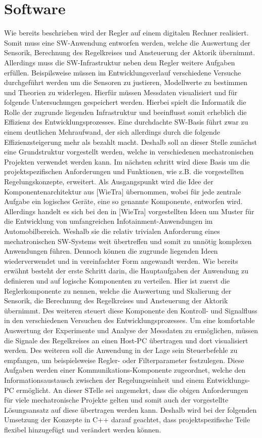 \section{Software}
Wie bereits beschrieben wird der Regler auf einem digitalen Rechner realisiert. Somit muss eine SW-Anwendung entworfen werden, welche die Auswertung der Sensorik, Berechnung des Regelkreises und Ansteuerung der Aktorik übernimmt. Allerdings muss die SW-Infrastruktur neben dem Regler weitere Aufgaben erfüllen. Beispilsweise müssen im Entwicklungsverlauf verschiedene Versuche durchgeführt werden um die Sensoren zu justieren, Modellwerte zu bestimmen und Theorien zu widerlegen. Hierfür müssen Messdaten visualisiert und für folgende Untersuchungen gespeichert werden.
Hierbei spielt die Informatik die Rolle der zugrunde liegenden Infrastruktur und beeinflusst somit erheblich die Effizienz des Entwicklungsprozesses. Eine durchdachte SW-Basis führt zwar zu einem deutlichen Mehraufwand, der sich allerdings durch die folgende Effizienzsteigerung mehr als bezahlt macht.
Deshalb soll an dieser Stelle zunächst eine Grundstruktur vorgestellt werden, welche in verschiedenen mechatronischen Projekten verwendet werden kann. Im nächsten schritt wird diese Basis um die projektspezifischen Anforderungen und Funktionen, wie z.B. die vorgestellten Regelungskonzepte, erweitert. Als Ausgangspunkt wird die Idee der Komponentenarchitektur aus [WieTra] übernommen, wobei für jede zentrale Aufgabe ein logisches Geräte, eine so genannte Komponente, entworfen wird.
Allerdings handelt es sich bei den in [WieTra] vorgestellten Ideen um Muster für die Entwicklung von umfangreichen Infotainment-Anwendungen im Automobilbereich. Weshalb sie die relativ trivialen Anforderung eines mechatronischen SW-Systems weit übertreffen und somit zu unnötig komplexen Anwendungen führen. Dennoch können die zugrunde liegenden Ideen wiederverwendet und in vereinfachter Form angewandt werden. 
Wie bereits erwähnt besteht der erste Schritt darin, die Hauptaufgaben der Anwendung zu definieren und auf logische Komponenten zu verteilen.
Hier ist zuerst die Reglerkomponente zu nennen, welche die Auswertung und Skalierung der Sensorik, die Berechnung des Regelkreises und Ansteuerung der Aktorik übernimmt. Des weiteren steuert diese Komponente den Kontroll- und Signalfluss in den verschiedenen Versuchen des Entwicklungsprozesses.
Um eine komfortable Auswertung der Experimente und Analyse der Messdaten zu ermöglichen, müssen die Signale des Regelkreises an einen Host-PC übertragen und dort visualisiert werden. Des weiteren soll die Anwendung in der Lage sein Steuerbefehle zu empfangen, um beispielsweise Regler- oder Filterparameter festzulegen. Diese Aufgaben werden einer Kommunikations-Komponente zugeordnet, welche den Informationsaustausch zwischen der Regelungseinheit und einem Entwicklungs-PC ermöglicht.
An dieser STelle sei angemekrt, dass die obigen Anforderungen für viele mechatronische Projekte gelten und somit auch der vorgestellte Lösungsansatz auf diese übertragen werden kann. Deshalb wird bei der folgenden Umsetzung der Konzepte in C++ darauf geachtet, dass projektspezifische Teile flexibel hinzugefügt und verändert werden können.

